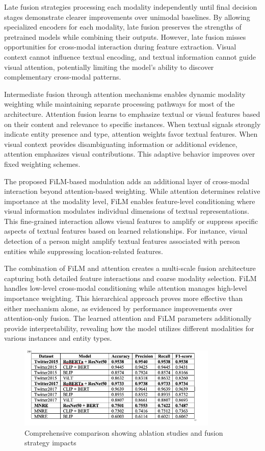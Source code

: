 \documentclass[12pt,a4paper]{report}
\begin{document}
Late fusion strategies processing each modality independently until final decision stages demonstrate clearer improvements over unimodal baselines. By allowing specialized encoders for each modality, late fusion preserves the strengths of pretrained models while combining their outputs. However, late fusion misses opportunities for cross-modal interaction during feature extraction. Visual context cannot influence textual encoding, and textual information cannot guide visual attention, potentially limiting the model's ability to discover complementary cross-modal patterns.

Intermediate fusion through attention mechanisms enables dynamic modality weighting while maintaining separate processing pathways for most of the architecture. Attention fusion learns to emphasize textual or visual features based on their content and relevance to specific instances. When textual signals strongly indicate entity presence and type, attention weights favor textual features. When visual context provides disambiguating information or additional evidence, attention emphasizes visual contributions. This adaptive behavior improves over fixed weighting schemes.

The proposed FiLM-based modulation adds an additional layer of cross-modal interaction beyond attention-based weighting. While attention determines relative importance at the modality level, FiLM enables feature-level conditioning where visual information modulates individual dimensions of textual representations. This fine-grained interaction allows visual features to amplify or suppress specific aspects of textual features based on learned relationships. For instance, visual detection of a person might amplify textual features associated with person entities while suppressing location-related features.

The combination of FiLM and attention creates a multi-scale fusion architecture capturing both detailed feature interactions and coarse modality selection. FiLM handles low-level cross-modal conditioning while attention manages high-level importance weighting. This hierarchical approach proves more effective than either mechanism alone, as evidenced by performance improvements over attention-only fusion. The learned attention and FiLM parameters additionally provide interpretability, revealing how the model utilizes different modalities for various instances and entity types.

\begin{figure}[H]
\centering
\includegraphics[width=0.85\textwidth]{full_results.png}
\caption{Comprehensive comparison showing ablation studies and fusion strategy impacts}
\label{fig:full_results}
\end{figure}
\end{document}
